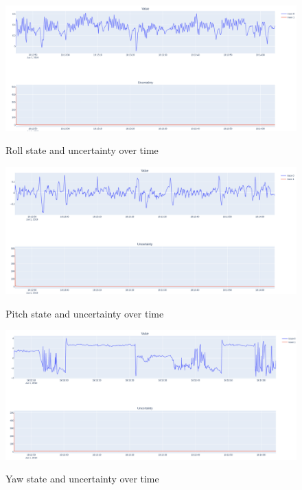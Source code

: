 \documentclass[12pt]{article}
\begin{document}
\begin{figure}[H]
    \centering
    \includegraphics[width=\linewidth]{figures/r_uncertainty.png}\\
    \caption{Roll state and uncertainty over time}
    \label{fig:r}
\end{figure}
\begin{figure}[H]
    \centering
    \includegraphics[width=\linewidth]{figures/p_uncertainty.png}\\
    \caption{Pitch state and uncertainty over time}
    \label{fig:p}
\end{figure}
\begin{figure}[H]
    \centering
    \includegraphics[width=\linewidth]{figures/yw_uncertainty.png}\\
    \caption{Yaw state and uncertainty over time}
    \label{fig:yw}
\end{figure}
\end{document}
